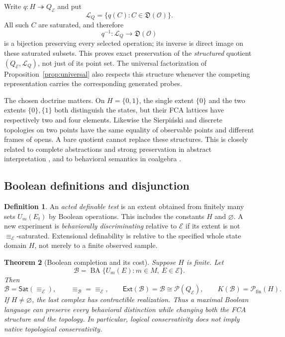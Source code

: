 \documentclass[11pt]{article}
\newtheorem{theorem}{Theorem}[section]
\theoremstyle{definition}
\newtheorem{definition}[theorem]{Definition}
\newcommand{\Pow}{\mathcal P}
\newcommand{\Fin}{\mathcal P_{\mathrm{fin}}}
\newcommand{\Ext}{\mathsf{Ext}}
\newcommand{\Sat}{\mathsf{Sat}}
\newcommand{\BA}{\operatorname{BA}}
\begin{document}
Write $q:H\twoheadrightarrow Q_{\mathcal E}$ and put
\[
 \mathcal L_Q=\{q(C):C\in\mathfrak D(\mathcal O)\}.
\]
All such $C$ are saturated, and therefore
\[
 q^{-1}:\mathcal L_Q\longrightarrow\mathfrak D(\mathcal O)
\]
is a bijection preserving every selected operation; its inverse is direct
image on these saturated subsets. This proves exact preservation of the
\emph{structured} quotient $(Q_{\mathcal E},\mathcal L_Q)$, not just
of its point set. The universal factorization of
Proposition~\ref{prop:universal} also respects this structure whenever the
competing representation carries the corresponding generated probes.

The chosen doctrine matters. On $H=\{0,1\}$, the single extent $\{0\}$
and the two extents $\{0\},\{1\}$ both distinguish the states, but their
FCA lattices have respectively two and four elements. Likewise the
Sierpi\'nski and discrete topologies on two points have the same equality
of observable points and different frames of opens. A bare quotient cannot
replace these structures. This is closely related to complete abstractions
and strong preservation in abstract interpretation \cite{RanzatoTapparo},
and to behavioral semantics in coalgebra \cite{Rutten}.

\subsection{Boolean definitions and disjunction}

\begin{definition}
An \emph{acted definable test} is an extent obtained from finitely many
sets $U_m(E_t)$ by Boolean operations. This includes the constants $H$
and $\varnothing$. A new experiment is \emph{behaviorally discriminating}
relative to $\mathcal E$ if its extent is not
$\equiv_{\mathcal E}$-saturated. Extensional definability is relative to the
specified whole state domain $H$, not merely to a finite observed sample.
\end{definition}

\begin{theorem}[Boolean completion and its cost]\label{thm:boolean}
Suppose $H$ is finite. Let
\[
 \mathcal B=\BA\{U_m(E):m\in M,\ E\in\mathcal E\}.
\]
Then
\[
 \mathcal B=\Sat(\equiv_{\mathcal E}),\qquad
 \equiv_{\mathcal B}=\equiv_{\mathcal E},\qquad
 \Ext(\mathcal B)=\mathcal B\cong\Pow(Q_{\mathcal E}),\qquad
 K(\mathcal B)=\Fin(H).
\]
If $H\ne\varnothing$, the last complex has contractible realization.
Thus a maximal Boolean language can preserve every behavioral distinction
while changing both the FCA structure and the topology. In particular,
logical conservativity does not imply native topological conservativity.
\end{theorem}
\end{document}
